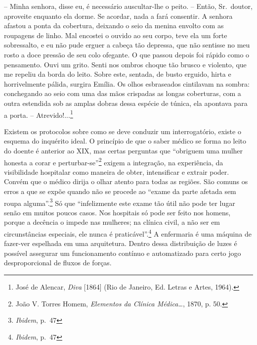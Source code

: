 -- Minha senhora, disse eu, é necessário auscultar-lhe o peito. --
Então, Sr.~doutor, aproveite enquanto ela dorme. Se acordar, nada a fará
consentir. A senhora afastou a ponta da cobertura, deixando o seio da
menina envolto com as roupagens de linho. Mal encostei o ouvido ao seu
corpo, teve ela um forte sobressalto, e eu não pude erguer a cabeça tão
depressa, que não sentisse no meu rosto a doce pressão de seu colo
ofegante. O que passou depois foi rápido como o pensamento. Ouvi um
grito. Senti nos ombros choque tão brusco e violento, que me repeliu da
borda do leito. Sobre este, sentada, de busto erguido, hirta e
horrivelmente pálida, surgira Emília. Os olhos esbraseados cintilavam na
sombra: conchegando ao seio com uma das mãos crispadas as longas
coberturas, com a outra estendida sob as amplas dobras dessa espécie de
túnica, ela apontava para a porta. -- Atrevido!...\footnote{José de
  Alencar, \emph{Diva} {[}1864{]} (Rio de Janeiro, Ed. Letras e Artes,
  1964).}

Existem os protocolos sobre como se deve conduzir um interrogatório,
existe o esquema do inquérito ideal. O princípio de que o saber médico
se forma no leito do doente é anterior ao XIX, mas certas perguntas que
``obriguem uma mulher honesta a corar e perturbar-se''\footnote{João V.
  Torres Homem, \emph{Elementos da Clínica Médica\ldots{}}, 1870, p. 50.}
exigem a integração, na experiência, da visibilidade hospitalar como
maneira de obter, intensificar e extrair poder. Convém que o médico
dirija o olhar atento para todas as regiões. São comuns os erros a que
se expõe quando não se procede ao ``exame da parte afetada sem roupa
alguma''.\footnote{\emph{Ibidem}, p.~47} Só que ``infelizmente este
exame tão útil não pode ter lugar senão em muitos poucos casos. Nos
hospitais só pode ser feito nos homens, porque a decência o impede nas
mulheres; na clínica civil, a não ser em circunstâncias especiais, ele
nunca é praticável''.\footnote{\emph{Ibidem}, p.~47} A enfermaria é uma
máquina de fazer-ver espelhada em uma arquitetura. Dentro dessa
distribuição de luzes é possível assegurar um funcionamento contínuo e
automatizado para certo jogo desproporcional de fluxos de forças.

